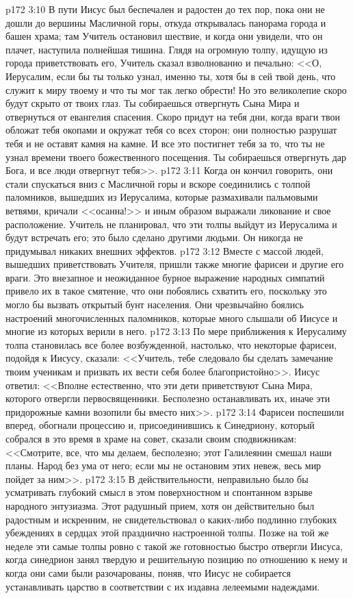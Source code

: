 \vs p172 3:10 В пути Иисус был беспечален и радостен до тех пор, пока они не дошли до вершины Масличной горы, откуда открывалась панорама города и башен храма; там Учитель остановил шествие, и когда они увидели, что он плачет, наступила полнейшая тишина. Глядя на огромную толпу, идущую из города приветствовать его, Учитель сказал взволнованно и печально: <<О, Иерусалим, если бы ты только узнал, именно ты, хотя бы в сей твой день, что служит к миру твоему и что ты мог так легко обрести! Но это великолепие скоро будут скрыто от твоих глаз. Ты собираешься отвергнуть Сына Мира и отвернуться от евангелия спасения. Скоро придут на тебя дни, когда враги твои обложат тебя окопами и окружат тебя со всех сторон; они полностью разрушат тебя и не оставят камня на камне. И все это постигнет тебя за то, что ты не узнал времени твоего божественного посещения. Ты собираешься отвергнуть дар Бога, и все люди отвергнут тебя>>.
\vs p172 3:11 Когда он кончил говорить, они стали спускаться вниз с Масличной горы и вскоре соединились с толпой паломников, вышедших из Иерусалима, которые размахивали пальмовыми ветвями, кричали <<осанна!>> и иным образом выражали ликование и свое расположение. Учитель не планировал, что эти толпы выйдут из Иерусалима и будут встречать его; это было сделано другими людьми. Он никогда не придумывал никаких внешних эффектов.
\vs p172 3:12 Вместе с массой людей, вышедших приветствовать Учителя, пришли также многие фарисеи и другие его враги. Это внезапное и неожиданное бурное выражение народных симпатий привело их в такое смятение, что они побоялись схватить его, поскольку это могло бы вызвать открытый бунт населения. Они чрезвычайно боялись настроений многочисленных паломников, которые много слышали об Иисусе и многие из которых верили в него.
\vs p172 3:13 По мере приближения к Иерусалиму толпа становилась все более возбужденной, настолько, что некоторые фарисеи, подойдя к Иисусу, сказали: <<Учитель, тебе следовало бы сделать замечание твоим ученикам и призвать их вести себя более благопристойно>>. Иисус ответил: <<Вполне естественно, что эти дети приветствуют Сына Мира, которого отвергли первосвященники. Бесполезно останавливать их, иначе эти придорожные камни возопили бы вместо них>>.
\vs p172 3:14 Фарисеи поспешили вперед, обогнали процессию и, присоединившись к Синедриону, который собрался в это время в храме на совет, сказали своим сподвижникам: <<Смотрите, все, что мы делаем, бесполезно; этот Галилеянин смешал наши планы. Народ без ума от него; если мы не остановим этих невеж, весь мир пойдет за ним>>.
\vs p172 3:15 В действительности, неправильно было бы усматривать глубокий смысл в этом поверхностном и спонтанном взрыве народного энтузиазма. Этот радушный прием, хотя он действительно был радостным и искренним, не свидетельствовал о каких\hyp{}либо подлинно глубоких убеждениях в сердцах этой празднично настроенной толпы. Позже на той же неделе эти самые толпы ровно с такой же готовностью быстро отвергли Иисуса, когда синедрион занял твердую и решительную позицию по отношению к нему и когда они сами были разочарованы, поняв, что Иисус не собирается устанавливать царство в соответствии с их издавна лелеемыми надеждами.

